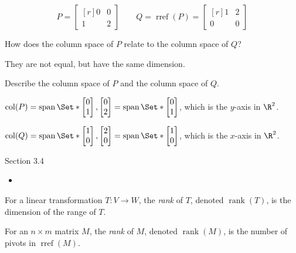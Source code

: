 \documentclass{problemset}
\DeclareMathOperator{\Span}{span}
\DeclareMathOperator{\Rref}{rref}
\DeclareMathOperator{\Rank}{rank}
\DeclareMathOperator{\Col}{col}
\newcommand{\rref}{\Rref}
\newcommand{\mat}[1]{\begin{bmatrix*}[r]#1\end{bmatrix*}}
\begin{document}
	\question
	\[
		P=\mat{0&0\\1&2}\qquad Q=\rref(P)=\mat{1&2\\0&0}
	\]
	\begin{parts}
		\item How does the column space of $P$ relate to the column space of $Q$?
			\begin{solution}
				They are not equal, but have the same dimension.
			\end{solution}
		\item Describe the column space of $P$ and the column space of $Q$.
			\begin{solution}
				$\Col(P)=\Span\Set*{\mat{0\\1},\mat{0\\2}}=\Span\Set*{\mat{0\\1}}$,
				which is the $y$-axis in $\R^2$. 

				$\Col(Q)=\Span\Set*{\mat{1\\0},\mat{2\\0}}=\Span\Set*{\mat{1\\0}}$,
				which is the $x$-axis in $\R^2$. 
			\end{solution}
	\end{parts}


\begin{lesson}
	\newpage

	Section 3.4

	\begin{itemize}
		\item 
	\end{itemize}


	\newpage
\end{lesson}
	\newpage
	\begin{definition}[Rank]
		For a linear transformation $T:V\to W$, the \emph{rank} of $T$,
		denoted $\Rank(T)$, is the dimension of the range of $T$.

		For an $n\times m$ matrix $M$, the \emph{rank} of $M$, denoted
		$\Rank(M)$, is the number of pivots in $\rref(M)$.
	\end{definition}
\end{document}

